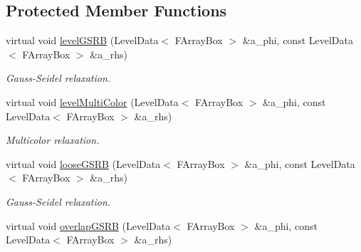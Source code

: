 \subsection*{Protected Member Functions}
\begin{DoxyCompactItemize}
\item 
\hypertarget{class_darcy_brinkman_op_a0f64c952b5180bb6ab279842b4f0cb50}{virtual void \hyperlink{class_darcy_brinkman_op_a0f64c952b5180bb6ab279842b4f0cb50}{level\-G\-S\-R\-B} (Level\-Data$<$ F\-Array\-Box $>$ \&a\-\_\-phi, const Level\-Data$<$ F\-Array\-Box $>$ \&a\-\_\-rhs)}\label{class_darcy_brinkman_op_a0f64c952b5180bb6ab279842b4f0cb50}

\begin{DoxyCompactList}\small\item\em Gauss-\/\-Seidel relaxation. \end{DoxyCompactList}\item 
\hypertarget{class_darcy_brinkman_op_a62d977a105970a27de2f50989798c3d8}{virtual void \hyperlink{class_darcy_brinkman_op_a62d977a105970a27de2f50989798c3d8}{level\-Multi\-Color} (Level\-Data$<$ F\-Array\-Box $>$ \&a\-\_\-phi, const Level\-Data$<$ F\-Array\-Box $>$ \&a\-\_\-rhs)}\label{class_darcy_brinkman_op_a62d977a105970a27de2f50989798c3d8}

\begin{DoxyCompactList}\small\item\em Multicolor relaxation. \end{DoxyCompactList}\item 
\hypertarget{class_darcy_brinkman_op_a2f0ad8188c617c1f0a560dda3aa88ed1}{virtual void \hyperlink{class_darcy_brinkman_op_a2f0ad8188c617c1f0a560dda3aa88ed1}{loose\-G\-S\-R\-B} (Level\-Data$<$ F\-Array\-Box $>$ \&a\-\_\-phi, const Level\-Data$<$ F\-Array\-Box $>$ \&a\-\_\-rhs)}\label{class_darcy_brinkman_op_a2f0ad8188c617c1f0a560dda3aa88ed1}

\begin{DoxyCompactList}\small\item\em Gauss-\/\-Seidel relaxation. \end{DoxyCompactList}\item 
\hypertarget{class_darcy_brinkman_op_a5c792a6fc34828e86caa1492346abdbf}{virtual void \hyperlink{class_darcy_brinkman_op_a5c792a6fc34828e86caa1492346abdbf}{overlap\-G\-S\-R\-B} (Level\-Data$<$ F\-Array\-Box $>$ \&a\-\_\-phi, const Level\-Data$<$ F\-Array\-Box $>$ \&a\-\_\-rhs)}\label{class_darcy_brinkman_op_a5c792a6fc34828e86caa1492346abdbf}


\end{DoxyCompactItemize}
